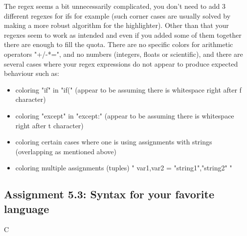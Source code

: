 \documentclass[a4paper]{article}
\begin{document}
The regex seems a bit unnecessarily  complicated, you don't need to add 3 different regexes for ifs for example (such corner cases are usually solved by making a more robust algorithm for the highlighter). Other than that your regexes seem to work as intended and even if you added some of them together there are enough to fill the quota. There are no specific colors for arithmetic operators "+/-*=", and no numbers (integers, floats or scientific), and there are several cases where your regex expressions do not appear to produce expected behaviour such as:
\begin{itemize}
\item coloring "if" in "if(" (appear to be assuming there is whitespace right after f character)
\item coloring "except" in "except:" (appear to be assuming there is whitespace right after t character)
\item coloring certain cases where one is using assignments with strings (overlapping as mentioned above)
\item coloring multiple assignments (tuples) " var1,var2 = "string1","string2" "
\end{itemize}

\subsection*{Assignment 5.3: Syntax for your favorite language}
C

\vspace{5mm}
\end{document}
